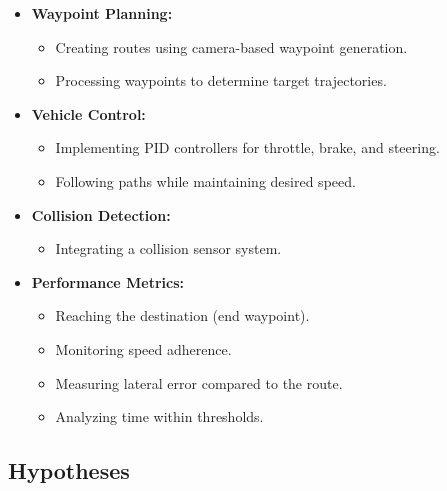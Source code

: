 \documentclass[conference]{IEEEtran}
\begin{document}
\begin{itemize}
    \item \textbf{Waypoint Planning:}
        \begin{itemize}
            \item Creating routes using camera-based waypoint generation.
            \item Processing waypoints to determine target trajectories.
        \end{itemize}

    \item \textbf{Vehicle Control:}
        \begin{itemize}
            \item Implementing PID controllers for throttle, brake, and steering.
            \item Following paths while maintaining desired speed.
        \end{itemize}

    \item \textbf{Collision Detection:}
        \begin{itemize}
            \item Integrating a collision sensor system.
        \end{itemize}

    \item \textbf{Performance Metrics:}
        \begin{itemize}
            \item Reaching the destination (end waypoint).
            \item Monitoring speed adherence.
            \item Measuring lateral error compared to the route.
            \item Analyzing time within thresholds.
        \end{itemize}
\end{itemize}

\subsection{Hypotheses}
\end{document}
